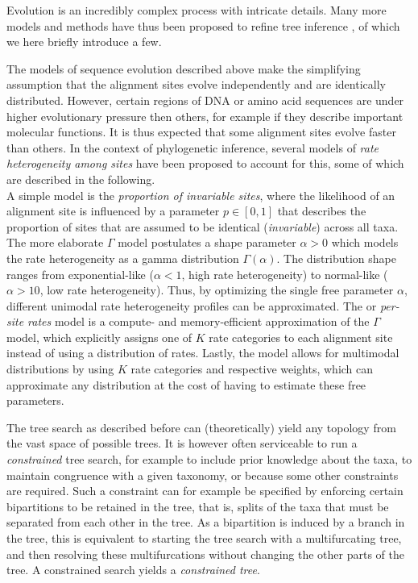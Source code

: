 Evolution is an incredibly complex process with intricate details.
Many more models and methods have thus been proposed to refine tree inference \cite{Yang2014},
of which we here briefly introduce a few.

The models of sequence evolution described above make the simplifying assumption
that the alignment sites evolve independently and are identically distributed.
However, certain regions of DNA or amino acid sequences are under higher evolutionary pressure then others,
for example if they describe important molecular functions.
It is thus expected that some alignment sites evolve faster than others.
In the context of phylogenetic inference,
several models of \emph{rate heterogeneity among sites} have been proposed to account for this,
some of which are described in the following.
\\
A simple model is the \emph{proportion of invariable sites},
where the likelihood of an alignment site is influenced by a parameter $p \in [0,1]$
that describes the proportion of sites that are assumed to be identical (\emph{invariable}) across all taxa.
The more elaborate $\Gamma$ model \cite{Yang1994a} postulates a shape parameter $\alpha > 0$
which models the rate heterogeneity as a gamma distribution $\Gamma(\alpha)$.
The distribution shape ranges from exponential-like ($\alpha < 1$, high rate heterogeneity)
to normal-like ($\alpha > 10$, low rate heterogeneity).
Thus, by optimizing the single free parameter $\alpha$,
different unimodal rate heterogeneity profiles can be approximated.
The  or \emph{per-site rates} model \cite{Stamatakis2006a}
is a compute- and memory-efficient approximation of the $\Gamma$ model,
which explicitly assigns one of $K$ rate categories to each alignment site instead of using a distribution of rates.
Lastly, the  model \cite{Yang1995} allows for multimodal distributions
by using $K$ rate categories and respective weights,
which can approximate any distribution at the cost of having to estimate these free parameters.

The tree search as described before can (theoretically) yield any topology from the vast space of possible trees.
It is however often serviceable to run a \emph{constrained} tree search,
for example to include prior knowledge about the taxa,
to maintain congruence with a given taxonomy, or because some other constraints are required.
Such a constraint can for example be specified by enforcing certain bipartitions to be retained in the tree,
that is, splits of the taxa that must be separated from each other in the tree.
As a bipartition is induced by a branch in the tree,
this is equivalent to starting the tree search with a multifurcating tree,
and then resolving these multifurcations without changing the other parts of the tree.
A constrained search yields a \emph{constrained tree}.


